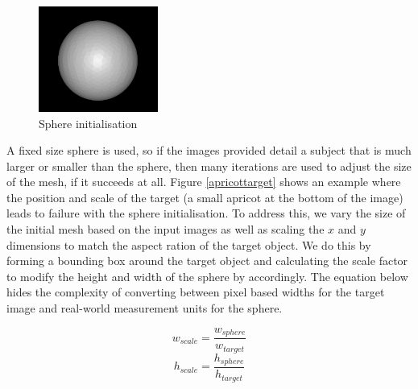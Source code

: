 \documentclass{article}
\begin{document}
\begin{figure}[h!]
  \centering
  \includegraphics[width=0.35\textwidth]{images/sphereinit.png}
  \caption{Sphere initialisation}
  \label{sphereinit}
\end{figure}

A fixed size sphere is used, so if the images provided detail a subject that is much larger or smaller than the sphere, then many iterations are used to adjust the size of the mesh, if it succeeds at all. Figure \ref{apricottarget} shows an example where the position and scale of the target (a small apricot at the bottom of the image) leads to failure with the sphere initialisation. To address this, we vary the size of the initial mesh based on the input images as well as scaling the $x$ and $y$ dimensions to match the aspect ration of the target object. We do this by forming a bounding box around the target object and calculating the scale factor to modify the height and width of the sphere by accordingly. The equation below hides the complexity of converting between pixel based widths for the target image and real-world measurement units for the sphere.

\[w_{scale} = \frac{w_{sphere}}{w_{target}}\]
\[h_{scale} = \frac{h_{sphere}}{h_{target}}\]
\end{document}
